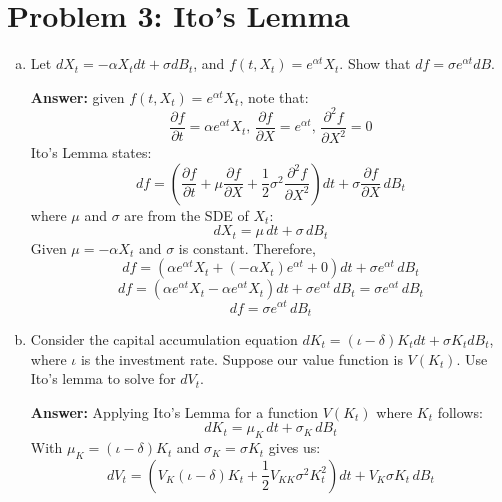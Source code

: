 \documentclass[11pt]{extarticle}
\theoremstyle{plain}
\theoremstyle{definition}
\begin{document}
\vspace{5mm}
\section*{Problem 3: Ito's Lemma}

\begin{enumerate}[(a)]
\item Let $dX_t = - \alpha X_t dt + \sigma dB_t$, and $f(t, X_t) = e^{\alpha t} X_t$. Show that $df = \sigma e^{\alpha t} d B$. 

\textbf{Answer:} given $
f(t, X_t) = e^{\alpha t} X_t
$, note that:
   \[
   \frac{\partial f}{\partial t} = \alpha e^{\alpha t} X_t\text{, \  } \frac{\partial f}{\partial X} = e^{\alpha t}\text{, \  } \frac{\partial^2 f}{\partial X^2} = 0 
   \]
Ito's Lemma states:
\[
df = \left( \frac{\partial f}{\partial t} + \mu \frac{\partial f}{\partial X} + \frac{1}{2} \sigma^2 \frac{\partial^2 f}{\partial X^2} \right) dt + \sigma \frac{\partial f}{\partial X} \, dB_t
\]
where \( \mu \) and \( \sigma \) are from the SDE of \( X_t \):
\[
dX_t = \mu \, dt + \sigma \, dB_t
\]
Given \( \mu = -\alpha X_t \) and \( \sigma \) is constant. Therefore,
\[
df = \left( \alpha e^{\alpha t} X_t + (-\alpha X_t) e^{\alpha t} + 0 \right) dt + \sigma e^{\alpha t} \, dB_t
\]
\[
df = \left( \alpha e^{\alpha t} X_t - \alpha e^{\alpha t} X_t \right) dt + \sigma e^{\alpha t} \, dB_t = \sigma e^{\alpha t} \, dB_t
\]
\[
df = \sigma e^{\alpha t} \, dB_t
\]

\item Consider the capital accumulation equation $dK_t = (\iota - \delta) K_t dt + \sigma K_t dB_t$, where $\iota$ is the investment rate. Suppose our value function is $V(K_t)$. Use Ito's lemma to solve for $dV_t$.   

\textbf{Answer:} Applying Ito's Lemma for a function \( V(K_t) \) where \( K_t \) follows:
\[
dK_t = \mu_K \, dt + \sigma_K \, dB_t
\]
With $\mu_K =  (\iota - \delta) K_t$ and $\sigma_K = \sigma K_t$ gives us:
\[
dV_t = \left( V_K (\iota - \delta) K_t + \frac{1}{2} V_{KK} \sigma^2 K_t^2 \right) dt + V_K \sigma K_t \, dB_t
\]



\end{enumerate}
\end{document}
